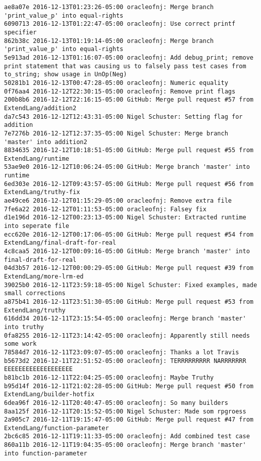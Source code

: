 \begin{lstlisting}
ae8a07e 2016-12-13T01:23:26-05:00 oracleofnj: Merge branch 'print_value_p' into equal-rights
6090713 2016-12-13T01:22:47-05:00 oracleofnj: Use correct printf specifier
862b38c 2016-12-13T01:19:14-05:00 oracleofnj: Merge branch 'print_value_p' into equal-rights
5e913ad 2016-12-13T01:16:07-05:00 oracleofnj: Add debug_print; remove print statement that was causing us to falsely pass test cases from to_string; show usage in UnOp(Neg)
50281b1 2016-12-13T00:47:28-05:00 oracleofnj: Numeric equality
0f76aa4 2016-12-12T22:30:15-05:00 oracleofnj: Remove print flags
200b8b6 2016-12-12T22:16:15-05:00 GitHub: Merge pull request #57 from ExtendLang/addition2
da7c543 2016-12-12T12:43:31-05:00 Nigel Schuster: Setting flag for addition
7e7276b 2016-12-12T12:37:35-05:00 Nigel Schuster: Merge branch 'master' into addition2
8834635 2016-12-12T10:18:51-05:00 GitHub: Merge pull request #55 from ExtendLang/runtime
53ae9e0 2016-12-12T10:06:24-05:00 GitHub: Merge branch 'master' into runtime
6ed303e 2016-12-12T09:43:57-05:00 GitHub: Merge pull request #56 from ExtendLang/truthy-fix
ae49ce6 2016-12-12T01:15:29-05:00 oracleofnj: Remove extra file
7fe6a22 2016-12-12T01:11:53-05:00 oracleofnj: Falsey fix
d1e196d 2016-12-12T00:23:13-05:00 Nigel Schuster: Extracted runtime into seperate file
ecc620e 2016-12-12T00:17:06-05:00 GitHub: Merge pull request #54 from ExtendLang/final-draft-for-real
4c8caa5 2016-12-12T00:09:16-05:00 GitHub: Merge branch 'master' into final-draft-for-real
04d3b57 2016-12-12T00:00:29-05:00 GitHub: Merge pull request #39 from ExtendLang/more-lrm-ed
39025b0 2016-12-11T23:59:18-05:00 Nigel Schuster: Fixed examples, made small corrections
a875b41 2016-12-11T23:51:30-05:00 GitHub: Merge pull request #53 from ExtendLang/truthy
616dd34 2016-12-11T23:15:54-05:00 oracleofnj: Merge branch 'master' into truthy
0fa8255 2016-12-11T23:14:42-05:00 oracleofnj: Apparently still needs some work
78584d7 2016-12-11T23:09:07-05:00 oracleofnj: Thanks a lot Travis
b5673d2 2016-12-11T22:51:52-05:00 oracleofnj: TERRRRRRRRR NARRRRRRR EEEEEEEEEEEEEEEEEEE
b81bc1b 2016-12-11T22:04:25-05:00 oracleofnj: Maybe Truthy
b95d14f 2016-12-11T21:02:28-05:00 GitHub: Merge pull request #50 from ExtendLang/builder-hotfix
6dea96f 2016-12-11T20:40:47-05:00 oracleofnj: So many builders
8aa125f 2016-12-11T20:15:52-05:00 Nigel Schuster: Made som rpgroess
2a905c7 2016-12-11T19:15:47-05:00 GitHub: Merge pull request #47 from ExtendLang/function-parameter
2bc6c85 2016-12-11T19:11:33-05:00 oracleofnj: Add combined test case
860a11b 2016-12-11T19:04:35-05:00 oracleofnj: Merge branch 'master' into function-parameter

\end{lstlisting}
